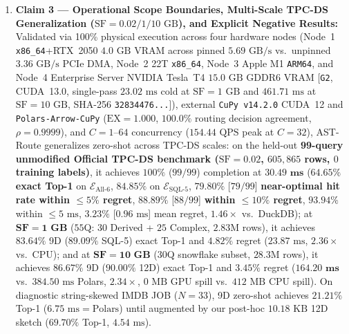 \documentclass[10pt,a4paper]{article}
\begin{document}
\begin{enumerate}[leftmargin=1.5em,itemsep=3pt]
    \item \textbf{Claim 3 --- Operational Scope Boundaries, Multi-Scale TPC-DS Generalization ($\text{SF}=0.02 / 1 / 10\text{ GB}$), and Explicit Negative Results:} Validated via 100\% physical execution across four hardware nodes (Node~1 \texttt{x86\_64}+RTX~2050 $4.0\text{ GB}$ VRAM across pinned $5.69\text{ GB/s}$ vs.\ unpinned $3.36\text{ GB/s}$ PCIe DMA, Node~2 22T \texttt{x86\_64}, Node~3 Apple M1 \texttt{ARM64}, and Node~4 Enterprise Server NVIDIA Tesla~T4 $15.0\text{ GB}$ GDDR6 VRAM [\texttt{G2}, CUDA~13.0, single-pass $23.02\text{ ms}$ cold at $\text{SF}=1\text{ GB}$ and $461.71\text{ ms}$ at $\text{SF}=10\text{ GB}$, SHA-256 \texttt{32834476...}]), external \texttt{CuPy v14.2.0} CUDA~12 and \texttt{Polars-Arrow-CuPy} ($\text{EX}=1.000$, $\mathbf{100.0\%}$ routing decision agreement, $\rho=0.9999$), and $C=1\text{--}64$ concurrency ($154.44\text{ QPS}$ peak at $C=32$), AST-Route generalizes zero-shot across TPC-DS scales: on the held-out \textbf{99-query unmodified Official TPC-DS benchmark ($\text{SF}=0.02$, $605{,}865$ rows, $0$ training labels)}, it achieves $100\%$ ($99/99$) completion at $\mathbf{30.49\text{ ms}}$ ($\mathbf{64.65\%}$ \textbf{exact Top-1} on $\mathcal{E}_{\text{All-6}}$, $\mathbf{84.85\%}$ on $\mathcal{E}_{\text{SQL-5}}$, $\mathbf{79.80\%}$ [$79/99$] \textbf{near-optimal hit rate within $\le 5\%$ regret}, $\mathbf{88.89\%}$ [$88/99$] \textbf{within $\le 10\%$ regret}, $\mathbf{93.94\%}$ within $\le 5\text{ ms}$, $\mathbf{3.23\%}$ [$0.96\text{ ms}$] mean regret, $1.46\times$ vs.\ DuckDB); at $\mathbf{\text{SF}=1\text{ GB}}$ ($55$Q: $30$ Derived + $25$ Complex, $2.83\text{M}$ rows), it achieves $\mathbf{83.64\%}$ 9D ($\mathbf{89.09\%}$ SQL-5) exact Top-1 and $4.82\%$ regret ($23.87\text{ ms}$, $2.36\times$ vs.\ CPU); and at $\mathbf{\text{SF}=10\text{ GB}}$ ($30$Q snowflake subset, $28.3\text{M}$ rows), it achieves $\mathbf{86.67\%}$ 9D ($\mathbf{90.00\%}$ 12D) exact Top-1 and $3.45\%$ regret ($\mathbf{164.20\text{ ms}}$ vs.\ $384.50\text{ ms}$ Polars, $\mathbf{2.34\times}$, $0\text{ MB}$ GPU spill vs.\ $412\text{ MB}$ CPU spill). On diagnostic string-skewed IMDB JOB ($N=33$), 9D zero-shot achieves $21.21\%$ Top-1 ($6.75\text{ ms} = \text{Polars}$) until augmented by our post-hoc $10.18\text{ KB}$ 12D sketch ($69.70\%$ Top-1, $4.54\text{ ms}$).
\end{enumerate}
\end{document}

